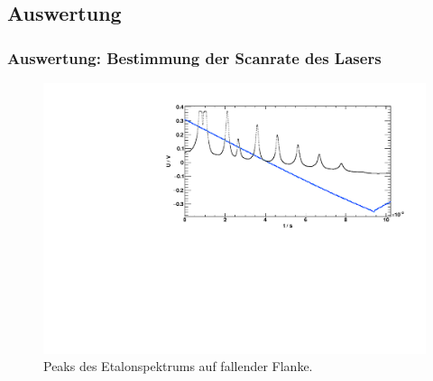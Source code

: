 \subsection{Auswertung}
\begin{frame}
\frametitle{Auswertung: Bestimmung der Scanrate des Lasers}
\begin{figure}
    \centering
    \includegraphics[width=\textwidth]{../img/down-etalon_zoom.pdf} %
    \caption{Peaks des Etalonspektrums auf fallender Flanke.}
\end{figure}
\end{frame}


